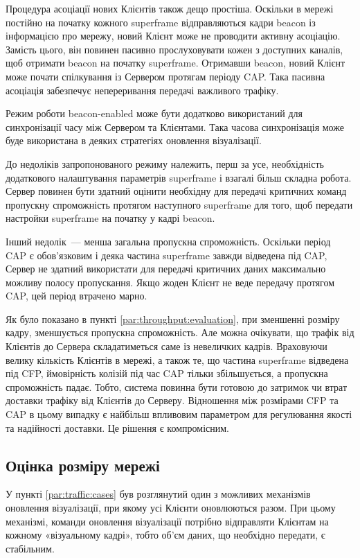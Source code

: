 \documentclass[a4paper,ukrainian,utf8,nocolumnsxix,nocolumnxxxii,nocolumnxxxi,floatsection,equationsection]{eskdtext}
\newcommand{\bem}[0]{beacon-enabled\xspace}
\begin{document}
Процедура асоціації нових Клієнтів також дещо простіша. Оскільки в мережі постійно на початку кожного superframe відправляються кадри beacon із інформацією про мережу, новий Клієнт може не проводити активну асоціацію. Замість цього, він повинен пасивно прослуховувати кожен з доступних каналів, щоб отримати beacon на початку superframe. Отримавши beacon, новий Клієнт може почати спілкування із Сервером протягам періоду CAP. Така пасивна асоціація забезпечує непереривання передачі важливого трафіку.

Режим роботи \bem може бути додатково використаний для синхронізації часу між Сервером та Клієнтами. Така часова синхронізація може буде використана в деяких стратегіях оновлення візуалізації.

До недоліків запропонованого режиму належить, перш за усе, необхідність додаткового налаштування параметрів superframe і взагалі більш складна робота. Сервер повинен бути здатний оцінити необхідну для передачі критичних команд пропускну спроможність протягом наступного superframe для того, щоб передати настройки superframe на початку у кадрі beacon.

Інший недолік~--- менша загальна пропускна спроможність. Оскільки період CAP є обов'язковим і деяка частина superframe завжди відведена під CAP, Сервер не здатний використати для передачі критичних даних максимально можливу полосу пропускання. Якщо жоден Клієнт не веде передачу протягом CAP, цей період втрачено марно.

Як було показано в пункті \ref{par:throughput:evaluation}, при зменшенні розміру кадру, зменшується пропускна спроможність. Але можна очікувати, що трафік від Клієнтів до Сервера складатиметься саме із невеличких кадрів. Враховуючи велику кількість Клієнтів в мережі, а також те, що частина superframe відведена під CFP, ймовірність колізій під час CAP тільки збільшується, а пропускна спроможність падає. Тобто, система повинна бути готовою до затримок чи втрат доставки трафіку від Клієнтів до Серверу. Відношення між розмірами CFP та CAP в цьому випадку є найбільш впливовим параметром для регулювання якості та надійності доставки. Це рішення є компромісним.

\subsection{Оцінка розміру мережі}

У пункті \ref{par:traffic:cases} був розглянутий один з можливих механізмів оновлення візуалізації, при якому усі Клієнти оновлюються разом. При цьому механізмі, команди оновлення візуалізації потрібно відправляти Клієнтам на кожному «візуальному кадрі», тобто об'єм даних, що необхідно передати, є стабільним. 
\end{document}
